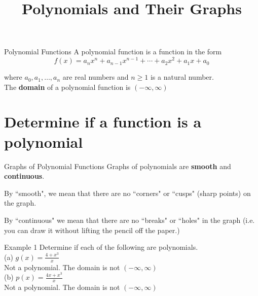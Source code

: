 \documentclass[t,usenames,dvipsnames]{beamer}
\title{Polynomials and Their Graphs}
\author{}
\date{}
\begin{document}
\maketitle

\begin{frame}{Polynomial Functions}
A \alert{polynomial function} is a function in the form
\[ f(x) = a_nx^n + a_{n-1}x^{n-1} + \cdots + a_2x^2 + a_1x + a_0 \]

where $a_0, a_1, \dots , a_n$ are real numbers and $n \geq 1$ is a natural number. \newline\\

The \textbf{domain} of a polynomial function is $(-\infty, \infty)$
\end{frame}

\section{Determine if a function is a polynomial}

\begin{frame}{Graphs of Polynomial Functions}
Graphs of polynomials are {\color{blue}\textbf{smooth}} and {\color{red}\textbf{continuous}}.   \newline\\  \pause

By ``smooth", we mean that there are no ``corners" or ``cusps" (sharp points) on the graph. \newline\\ \pause

By ``continuous" we mean that there are no ``breaks" or ``holes" in the graph (i.e. you can draw it without lifting the pencil off the paper.)
\end{frame}

\begin{frame}{Example 1}
Determine if each of the following are polynomials. \newline\\
(a) \quad $g(x) = \frac{4+x^3}{x}$  \newline\\  \pause
Not a polynomial. The domain is not $(-\infty, \infty)$ \newline\\  \pause
(b) \quad $p(x) = \frac{4x+x^3}{x}$ \newline\\  \pause
Not a polynomial. The domain is not $(-\infty, \infty)$ 
\end{frame}
\end{document}
